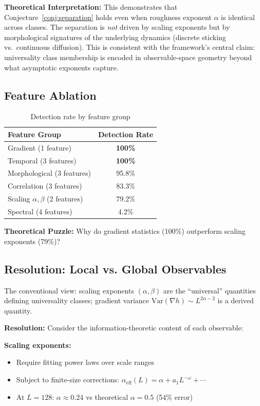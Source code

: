 \documentclass[aps,pre,reprint,amsmath,amssymb,superscriptaddress]{revtex4-2}
\begin{document}
\textbf{Theoretical Interpretation:} This demonstrates that Conjecture~\ref{conj:separation} holds even when roughness exponent $\alpha$ is identical across classes. The separation is \emph{not} driven by scaling exponents but by morphological signatures of the underlying dynamics (discrete sticking vs.\ continuous diffusion). This is consistent with the framework's central claim: universality class membership is encoded in observable-space geometry beyond what asymptotic exponents capture.

\subsection{Feature Ablation}

\begin{table}[h]
\centering
\caption{Detection rate by feature group}
\label{tab:ablation}
\begin{tabular}{lc}
\toprule
Feature Group & Detection Rate \\
\midrule
Gradient (1 feature) & \textbf{100\%} \\
Temporal (3 features) & \textbf{100\%} \\
Morphological (3 features) & 95.8\% \\
Correlation (3 features) & 83.3\% \\
Scaling $\alpha, \beta$ (2 features) & 79.2\% \\
Spectral (4 features) & 4.2\% \\
\bottomrule
\end{tabular}
\end{table}

\textbf{Theoretical Puzzle:} Why do gradient statistics (100\%) outperform scaling exponents (79\%)?

\subsection{Resolution: Local vs. Global Observables}
\label{sec:gradient}

The conventional view: scaling exponents $(\alpha, \beta)$ are the ``universal'' quantities defining universality classes; gradient variance $\text{Var}(\nabla h) \sim L^{2\alpha-2}$ is a derived quantity.

\textbf{Resolution:} Consider the information-theoretic content of each observable:

\textbf{Scaling exponents:}
\begin{itemize}
\item Require fitting power laws over scale ranges
\item Subject to finite-size corrections: $\alpha_{\text{eff}}(L) = \alpha + a_1 L^{-\omega} + \cdots$
\item At $L=128$: $\alpha \approx 0.24$ vs theoretical $\alpha = 0.5$ (54\% error)
\end{itemize}
\end{document}
